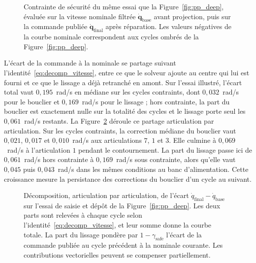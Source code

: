 \begin{figure}[!htbp]
    \centering
    
    \caption[Évolution du résidu de contrainte (saisie et dépôt)]{Contrainte de sécurité du même essai que la Figure~\ref{fig:pp_deep}, évaluée sur la vitesse nominale filtrée $\dot{\mathbf{q}}_{\mathrm{base}}$ avant projection, puis sur la commande publiée $\dot{\mathbf{q}}_{\mathrm{final}}$ après réparation. Les valeurs négatives de la courbe nominale correspondent aux cycles ombrés de la Figure~\ref{fig:pp_deep}.}\label{fig:pp_constraint}
\end{figure}

L'écart de la commande à la nominale se partage suivant l'identité~\eqref{eq:decomp_vitesse}, entre ce que le solveur ajoute au centre qui lui est fourni et ce que le lissage a déjà retranché en amont. Sur l'essai illustré, l'écart total vaut $0{,}195$~rad/s en médiane sur les cycles contraints, dont $0{,}032$~rad/s pour le bouclier et $0{,}169$~rad/s pour le lissage ; hors contrainte, la part du bouclier est exactement nulle sur la totalité des cycles et le lissage porte seul les $0{,}061$~rad/s restants. La Figure~\ref{fig:pp_vel_decomp} déroule ce partage articulation par articulation. Sur les cycles contraints, la correction médiane du bouclier vaut $0{,}021$, $0{,}017$ et $0{,}010$~rad/s aux articulations $7$, $1$ et $3$. Elle culmine à $0{,}069$~rad/s à l'articulation $1$ pendant le contournement. La part du lissage passe ici de $0{,}061$~rad/s hors contrainte à $0{,}169$~rad/s sous contrainte, alors qu'elle vaut $0{,}045$ puis $0{,}043$~rad/s dans les mêmes conditions au banc d'alimentation. Cette croissance mesure la persistance des corrections du bouclier d'un cycle au suivant.

\begin{figure}[!htbp]
    \centering
    
    \caption[Décomposition de la correction de vitesse (saisie et dépôt)]{Décomposition, articulation par articulation, de l'écart $\dot{q}_{\mathrm{final}}-\dot{q}_{\mathrm{base}}$ sur l'essai de saisie et dépôt de la Figure~\ref{fig:pp_deep}. Les deux parts sont relevées à chaque cycle selon l'identité~\eqref{eq:decomp_vitesse}, et leur somme donne la courbe totale. La part du lissage pondère par $1-\gamma_{\mathrm{safe}}$ l'écart de la commande publiée au cycle précédent à la nominale courante. Les contributions vectorielles peuvent se compenser partiellement.}\label{fig:pp_vel_decomp}
\end{figure}

